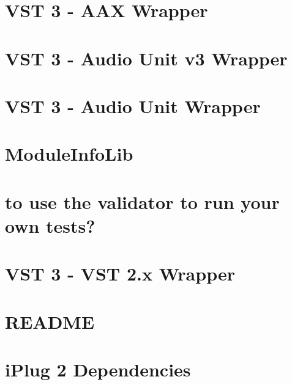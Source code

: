 \let\mypdfximage\pdfximage\def\pdfximage{\immediate\mypdfximage}\documentclass[twoside]{book}
\newcommand{\+}{\discretionary{\mbox{\scriptsize$\hookleftarrow$}}{}{}}
\begin{document}
\chapter{V\+ST 3 -\/ A\+AX Wrapper}
\label{_a_a_x_wrapper}

\chapter{V\+ST 3 -\/ Audio Unit v3 Wrapper}
\label{_a_uv3_wrapper}

\chapter{V\+ST 3 -\/ Audio Unit Wrapper}
\label{_a_u_wrapper}

\chapter{Module\+Info\+Lib}
\label{md__c_1__users_fab_src__github_branches__neural_amp_modeler_plugin_i_plug2__dependencies__i_plugb44f1cb5ac506e0bfa5ec42a99a9fd3a}

\chapter{to use the validator to run your own tests?}
\label{_how}

\chapter{V\+ST 3 -\/ V\+ST 2.x Wrapper}
\label{vst2xwrapper}

\chapter{R\+E\+A\+D\+ME}
\label{md__c_1__users_fab_src__github_branches__neural_amp_modeler_plugin_i_plug2__dependencies__i_plug__v_s_t3__s_d_k__r_e_a_d_m_e}

\chapter{i\+Plug 2 Dependencies}
\label{md__c_1__users_fab_src__github_branches__neural_amp_modeler_plugin_i_plug2__dependencies__r_e_a_d_m_e}

\end{document}
